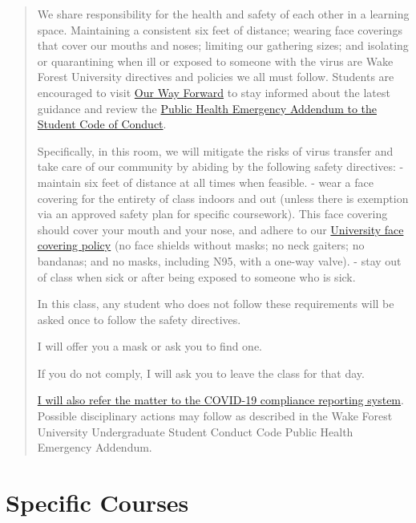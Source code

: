 \documentclass[
]{book}
\begin{document}
\begin{quote}
We share responsibility for the health and safety of each other in a learning space. Maintaining a consistent six feet of distance; wearing face coverings that cover our mouths and noses; limiting our gathering sizes; and isolating or quarantining when ill or exposed to someone with the virus are Wake Forest University directives and policies we all must follow. Students are encouraged to visit \href{https://ourwayforward.wfu.edu/}{Our Way Forward} to stay informed about the latest guidance and review the \href{https://studentconduct.wfu.edu/undergraduate-student-handbook/public-health-emergency-addendum/}{Public Health Emergency Addendum to the Student Code of Conduct}.

Specifically, in this room, we will mitigate the risks of virus transfer and take care of our community by abiding by the following safety directives:
- maintain six feet of distance at all times when feasible.
- wear a face covering for the entirety of class indoors and out (unless there is exemption via an approved safety plan for specific coursework). This face covering should cover your mouth and your nose, and adhere to our \href{https://drive.google.com/file/d/1Tqo-by1sjmc-kWUTwAqeNdaHq8OBsU9B/view}{University face covering policy} (no face shields without masks; no neck gaiters; no bandanas; and no masks, including N95, with a one-way valve).
- stay out of class when sick or after being exposed to someone who is sick.

In this class, any student who does not follow these requirements will be asked once to follow the safety directives.

I will offer you a mask or ask you to find one.

If you do not comply, I will ask you to leave the class for that day.

\href{https://cm.maxient.com/reportingform.php?WakeForestUniv\&layout_id=40}{I will also refer the matter to the COVID-19 compliance reporting system}. Possible disciplinary actions may follow as described in the Wake Forest University Undergraduate Student Conduct Code Public Health Emergency Addendum.
\end{quote}

\hypertarget{part-specific-courses}{%
\part*{Specific Courses}\label{part-specific-courses}}
\end{document}
